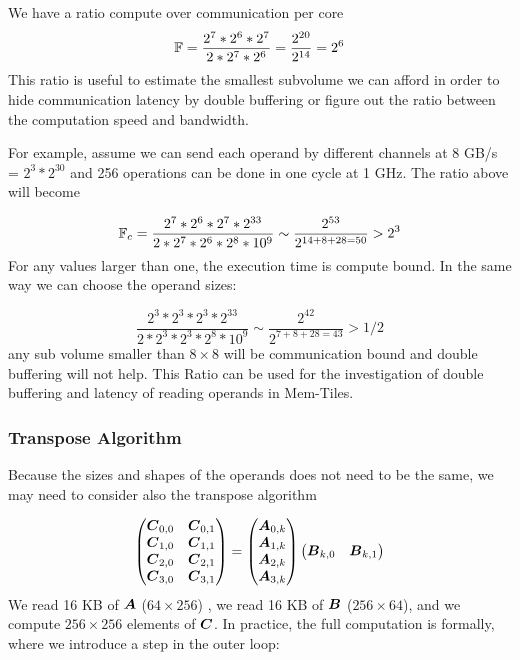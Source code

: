 \documentclass[journal]{IEEEtran}
\begin{document}
We have a ratio compute over communication per core
\begin{equation}
  \label{eq:ratio}
  \F = \frac{2^7 * 2^6 * 2^7 } { 2* 2^7 * 2^6} = \frac{2^{20}}{2^{14}} = 2^6
\end{equation}
This ratio is useful to estimate the smallest subvolume we can afford
in order to hide communication latency by double buffering or figure
out the ratio between the computation speed and bandwidth. 

For example, assume we can send each operand by different channels at
8 GB/s = $2^3 *2^{30}$ and 256 operations can be done in one cycle at
1 GHz. The ratio above will become

\[
\mathbb{F}_c = \frac{2^7 * 2^6 * 2^7 * 2^{33}} { 2* 2^7 * 2^6* 2^8 *10^9} \sim \frac{2^{53}}{2^{14+8+28=50}} > 2^3  
\]
For any values larger than one, the execution time is compute
bound. In the same way we can choose the operand sizes:

\[
\frac{2^3 * 2^3 * 2^3 * 2^{33}} { 2* 2^3 * 2^3* 2^8 *10^9} \sim \frac{2^{42}}{2^{7+8+28=43}} >1/2    
\]
any sub volume smaller than $8 \times 8$ will be communication bound
and double buffering will not help. This Ratio can be used for the
investigation of double buffering and latency of reading operands in
Mem-Tiles.

\subsubsection{Transpose Algorithm}
Because the sizes and shapes of the operands does not need to be the
same, we may need to consider also the transpose algorithm

{\small \begin{equation}
  \label{eq:gemmB}
  \begin{pmatrix}
    \Vc{C}_{0,0}  & \Vc{C}_{0,1}  \\
    \Vc{C}_{1,0}  & \Vc{C}_{1,1}    \\
    \Vc{C}_{2,0}  & \Vc{C}_{2,1}  \\
    \Vc{C}_{3,0}  & \Vc{C}_{3,1} \\
  \end{pmatrix}    =
  \begin{pmatrix}
    \Vc{A}_{0,k}  \\
    \Vc{A}_{1,k}  \\
    \Vc{A}_{2,k}  \\
    \Vc{A}_{3,k}  \\
  \end{pmatrix}  
  \begin{pmatrix}
    \Vc{B}_{k,0}  &  \Vc{B}_{k,1}  \\
  \end{pmatrix}    
\end{equation}
} We read 16 KB of ${\boldsymbol A}$ ($64 \times 256$) , we read 16 KB of
${\boldsymbol B}$ ($256 \times 64$), and we compute $256 \times 256$ elements
of ${\boldsymbol C}$. In practice, the full computation is formally, where we
introduce a step in the outer loop: 
\end{document}
